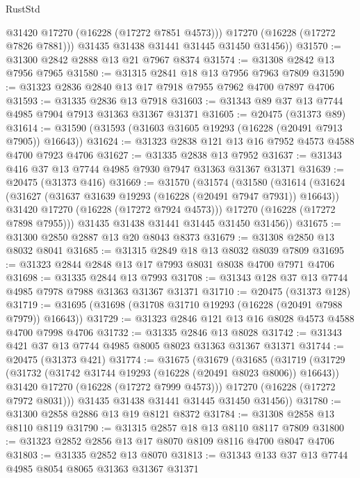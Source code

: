 \begin{lexlean}{RustStd}
\begin{coremodule}
            @31420
            @17270
            (@16228 (@17272 @7851 @4573)))
          @17270
          (@16228 (@17272 @7826 @7881)))
        @31435
        @31438
        @31441
        @31445
        @31450
        @31456))
@31570 := @31300 @2842 @2888 @13 @21 @7967 @8374
@31574 := @31308 @2842 @13 @7956 @7965
@31580 := @31315 @2841 @18 @13 @7956 @7963 @7809
@31590 := @31323 @2836 @2840 @13 @17 @7918 @7955 @7962 @4700 @7897 @4706
@31593 := @31335 @2836 @13 @7918
@31603 := @31343 @89 @37 @13 @7744 @4985 @7904 @7913 @31363 @31367 @31371
@31605 := @20475 (@31373 @89)
@31614 := @31590 (@31593 (@31603 @31605 @19293 (@16228 (@20491 @7913 @7905)) @16643))
@31624 := @31323 @2838 @121 @13 @16 @7952 @4573 @4588 @4700 @7923 @4706
@31627 := @31335 @2838 @13 @7952
@31637 := @31343 @416 @37 @13 @7744 @4985 @7930 @7947 @31363 @31367 @31371
@31639 := @20475 (@31373 @416)
@31669 := @31570
    (@31574
      (@31580
        (@31614
          (@31624
            (@31627 (@31637 @31639 @19293 (@16228 (@20491 @7947 @7931)) @16643))
            @31420
            @17270
            (@16228 (@17272 @7924 @4573)))
          @17270
          (@16228 (@17272 @7898 @7955)))
        @31435
        @31438
        @31441
        @31445
        @31450
        @31456))
@31675 := @31300 @2850 @2887 @13 @20 @8043 @8373
@31679 := @31308 @2850 @13 @8032 @8041
@31685 := @31315 @2849 @18 @13 @8032 @8039 @7809
@31695 := @31323 @2844 @2848 @13 @17 @7993 @8031 @8038 @4700 @7971 @4706
@31698 := @31335 @2844 @13 @7993
@31708 := @31343 @128 @37 @13 @7744 @4985 @7978 @7988 @31363 @31367 @31371
@31710 := @20475 (@31373 @128)
@31719 := @31695 (@31698 (@31708 @31710 @19293 (@16228 (@20491 @7988 @7979)) @16643))
@31729 := @31323 @2846 @121 @13 @16 @8028 @4573 @4588 @4700 @7998 @4706
@31732 := @31335 @2846 @13 @8028
@31742 := @31343 @421 @37 @13 @7744 @4985 @8005 @8023 @31363 @31367 @31371
@31744 := @20475 (@31373 @421)
@31774 := @31675
    (@31679
      (@31685
        (@31719
          (@31729
            (@31732 (@31742 @31744 @19293 (@16228 (@20491 @8023 @8006)) @16643))
            @31420
            @17270
            (@16228 (@17272 @7999 @4573)))
          @17270
          (@16228 (@17272 @7972 @8031)))
        @31435
        @31438
        @31441
        @31445
        @31450
        @31456))
@31780 := @31300 @2858 @2886 @13 @19 @8121 @8372
@31784 := @31308 @2858 @13 @8110 @8119
@31790 := @31315 @2857 @18 @13 @8110 @8117 @7809
@31800 := @31323 @2852 @2856 @13 @17 @8070 @8109 @8116 @4700 @8047 @4706
@31803 := @31335 @2852 @13 @8070
@31813 := @31343 @133 @37 @13 @7744 @4985 @8054 @8065 @31363 @31367 @31371

\end{coremodule}
\end{lexlean}
